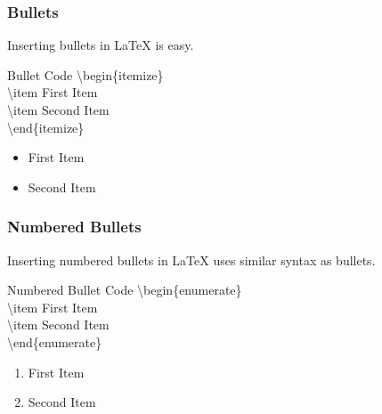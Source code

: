 \documentclass{beamer}
\begin{document}
\begin{frame}
\frametitle{Bullets}

Inserting bullets in LaTeX is easy.

\begin{block}{Bullet Code}
\textbackslash begin\{itemize\}
\\
\hspace{1cm}\textbackslash item First Item
\\
\hspace{1cm}\textbackslash item Second Item
\\
\textbackslash end\{itemize\}
\end{block}

\begin{example}[Bullet]
\begin{itemize}
\item First Item
\item Second Item
\end{itemize}
\end{example}

\end{frame}


\begin{frame}
\frametitle{Numbered Bullets}

Inserting numbered bullets in LaTeX uses similar syntax as bullets.

\begin{block}{Numbered Bullet Code}
\textbackslash begin\{enumerate\}
\\
\hspace{1cm}\textbackslash item First Item
\\
\hspace{1cm}\textbackslash item Second Item
\\
\textbackslash end\{enumerate\}
\end{block}

\begin{example}
\begin{enumerate}
\item First Item
\item Second Item
\end{enumerate}
\end{example}

\end{frame}
\end{document}
